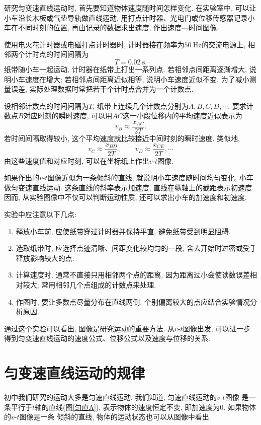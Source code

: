 \documentclass[11pt,a4paper]{ctexbook}
\newcommand{\unit}[1]{\ \mathrm{#1}}
\begin{document}
研究匀变速直线运动时, 首先要知道物体速度随时间怎样变化. 在实验室中, 可以让小车沿长木板或气垫导轨做直线运动,
用打点计时器、光电门或位移传感器记录小车在不同时刻的位置, 再由记录的数据求出速度, 作出速度—时间图像.

使用电火花计时器或电磁打点计时器时, 计时器接在频率为$50\unit{Hz}$的交流电源上, 相邻两个计时点的时间间隔为
$$T=0.02\unit{s}.$$
纸带随小车一起运动, 计时器在纸带上打出一系列点. 若相邻点间距离逐渐增大, 说明小车速度在增大; 若相邻点间距离近似相等,
说明小车速度近似不变. 为了减小测量误差, 实际处理数据时常把若干个计时点合并为一个计数点.

设相邻计数点的时间间隔为$T$, 纸带上连续几个计数点分别为$A,B,C,D,\cdots$. 要求计数点$B$对应时刻的瞬时速度,
可以用$AC$这一小段位移内的平均速度近似表示为
$$v_B\approx \frac{x_{AC}}{2T}.$$
若时间间隔取得较小, 这个平均速度就比较接近中间时刻的瞬时速度. 类似地,
$$v_C\approx \frac{x_{BD}}{2T},\qquad v_D\approx \frac{x_{CE}}{2T},\cdots$$
由这些速度值和对应时刻, 可以在坐标纸上作出$v$-$t$图像.

如果作出的$v$-$t$图像近似为一条倾斜的直线, 就说明小车速度随时间均匀变化, 小车做匀变速直线运动.
这条直线的斜率表示加速度, 直线在纵轴上的截距表示初速度. 因而, 从实验图像中不仅可以判断运动性质,
还可以求出小车的加速度和初速度.

实验中应注意以下几点:
\begin{enumerate}
    \item 释放小车前, 应使纸带穿过计时器并保持平直, 避免纸带受到明显阻碍.
    \item 选取纸带时, 应选择点迹清晰、间距变化较均匀的一段, 舍去开始时过密或受手释放影响较大的点.
    \item 计算速度时, 通常不直接只用相邻两个点的距离, 因为距离过小会使读数误差相对较大; 常用相邻几个点组成的计数点来处理.
    \item 作图时, 要让多数点尽量分布在直线两侧, 个别偏离较大的点应结合实验情况分析原因.
\end{enumerate}

通过这个实验可以看出, 图像是研究运动的重要方法. 从$v$-$t$图像出发, 可以进一步得到匀变速直线运动的速度公式、位移公式以及速度与位移的关系.

\section{匀变速直线运动的规律}

初中我们研究的运动大多是匀速直线运动. 我们知道, 匀速直线运动的$v$-$t$图像
是一条平行于$t$轴的直线(图\ref{匀直A}), 表示物体的速度恒定不变, 即加速度为0. 如果物体的$v$-$t$图像是一条
倾斜的直线, 物体的运动状态也可以从图像中看出.
\end{document}
